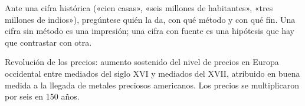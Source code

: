 \documentclass{book}
\begin{document}

\begin{tcolorbox}[title={Consejo}, studiumtip, breakable]

Ante una cifra histórica («cien casas», «seis millones de habitantes», «tres millones de indios»), pregúntese quién la da, con qué método y con qué fin. Una cifra sin método es una impresión; una cifra con fuente es una hipótesis que hay que contrastar con otra.

\end{tcolorbox}

\begin{tcolorbox}[title={Definición}, studiumdef, breakable]

Revolución de los precios: aumento sostenido del nivel de precios en Europa occidental entre mediados del siglo XVI y mediados del XVII, atribuido en buena medida a la llegada de metales preciosos americanos. Los precios se multiplicaron por seis en 150 años.

\end{tcolorbox}
\end{document}

